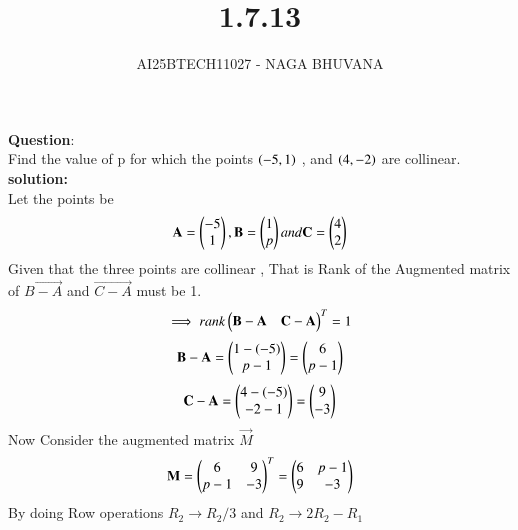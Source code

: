 \documentclass[journal,12pt,onecolumn]{IEEEtran}
\begin{document}
\title{1.7.13}
\author{AI25BTECH11027 - NAGA BHUVANA}
{\let\newpage\relax\maketitle}

\textbf{Question}:\\
\noindent Find the value of p for which the points $\left(-5,1\right)$ ,  and $\left(4,-2\right)$ are collinear.\\
\textbf{solution:}\\
Let the points be
\begin{align}
\mathbf{A}=\begin{pmatrix}-5\\1\end{pmatrix} , \mathbf{B}=\begin{pmatrix}1\\p\end{pmatrix} and \mathbf{C}=\begin{pmatrix}4\\2\end{pmatrix}\\
\end{align}
Given that the three points are collinear ,
That is Rank of the Augmented matrix of $\vec{B-A}$ and $\vec{C-A}$ must be 1.
\begin{align}
 \implies   rank\begin{pmatrix}\mathbf{B-A} & \mathbf{C-A}\end{pmatrix}^T=1
\end{align}
\begin{align}
    \mathbf{B-A}=\begin{pmatrix}1-(-5)\\p-1\end{pmatrix}=\begin{pmatrix}6\\p-1\end{pmatrix}
\end{align}
\begin{align}
    \mathbf{C-A}=\begin{pmatrix}4-(-5)\\-2-1\end{pmatrix}=\begin{pmatrix}9\\-3\end{pmatrix}
\end{align}
Now Consider the augmented matrix $\vec{M}$\\
\begin{align}
    \mathbf{M}=\begin{pmatrix}6 & 9 \\ p-1 & -3\end{pmatrix}^T=\begin{pmatrix}6 & p-1 \\ 9 & -3\end{pmatrix}
\end{align}
By doing Row operations $R_2 \longrightarrow R_2/3$ and  $R_2 \longrightarrow 2R_2-R_1$\\
\end{document}
